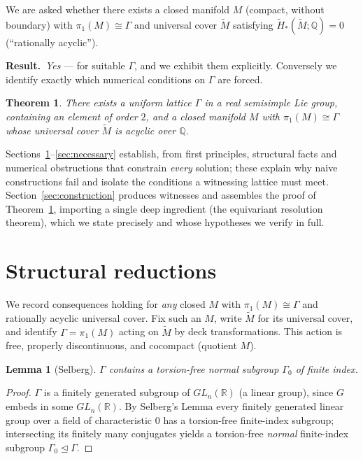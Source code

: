 \documentclass[12pt]{article}
\newcommand{\bR}{\mathbb{R}}
\newcommand{\bQ}{\mathbb{Q}}
\newtheorem{theorem}{Theorem}
\newtheorem{lemma}{Lemma}
\theoremstyle{definition}
\begin{document}
We are asked whether there exists a closed manifold $M$ (compact, without
boundary) with $\pi_1(M)\cong\Gamma$ and universal cover $\widetilde M$ satisfying
$\widetilde H_*(\widetilde M;\bQ)=0$ (``rationally acyclic'').

\medskip
\noindent\textbf{Result.}\ \emph{Yes} --- for suitable $\Gamma$, and we exhibit
them explicitly.  Conversely we identify exactly which numerical conditions on
$\Gamma$ are forced.

\begin{theorem}\label{thm:main}
There exists a uniform lattice $\Gamma$ in a real semisimple Lie group, containing
an element of order $2$, and a closed manifold $M$ with $\pi_1(M)\cong\Gamma$
whose universal cover $\widetilde M$ is acyclic over $\bQ$.
\end{theorem}

Sections~\ref{sec:reductions}--\ref{sec:necessary} establish, from first
principles, structural facts and numerical obstructions that constrain
\emph{every} solution; these explain why naive constructions fail and isolate the
conditions a witnessing lattice must meet.  Section~\ref{sec:construction}
produces witnesses and assembles the proof of Theorem~\ref{thm:main}, importing a
single deep ingredient (the equivariant resolution theorem), which we state
precisely and whose hypotheses we verify in full.

\section{Structural reductions}\label{sec:reductions}

We record consequences holding for \emph{any} closed $M$ with $\pi_1(M)\cong\Gamma$
and rationally acyclic universal cover.  Fix such an $M$, write $\widetilde M$ for
its universal cover, and identify $\Gamma=\pi_1(M)$ acting on $\widetilde M$ by
deck transformations.  This action is free, properly discontinuous, and cocompact
(quotient $M$).

\begin{lemma}[Selberg]\label{lem:selberg}
$\Gamma$ contains a torsion-free normal subgroup $\Gamma_0$ of finite index.
\end{lemma}

\begin{proof}
$\Gamma$ is a finitely generated subgroup of $GL_n(\bR)$ (a linear group), since
$G$ embeds in some $GL_n(\bR)$.  By Selberg's Lemma every finitely generated
linear group over a field of characteristic $0$ has a torsion-free finite-index
subgroup; intersecting its finitely many conjugates yields a torsion-free
\emph{normal} finite-index subgroup $\Gamma_0\trianglelefteq\Gamma$.
\end{proof}
\end{document}
